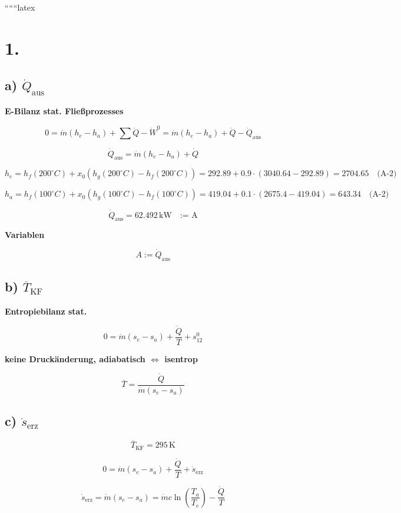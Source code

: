 
``````latex


\section*{1.}

\subsection*{a) $\dot{Q}_{\text{aus}}$}

\textbf{E-Bilanz stat. Fließprozesses}

\[
0 = \dot{m} \left( h_e - h_a \right) + \sum \dot{Q} - \dot{W}^0 = \dot{m} (h_e - h_a) + \dot{Q} - \dot{Q}_{\text{aus}}
\]

\[
\dot{Q}_{\text{aus}} = \dot{m} (h_e - h_a) + \dot{Q}
\]

\[
h_e = h_f(200^\circ C) + x_0 \left( h_g(200^\circ C) - h_f(200^\circ C) \right) = 292.89 + 0.9 \cdot (3040.64 - 292.89) = 2704.65 \quad \text{(A-2)}
\]

\[
h_a = h_f(100^\circ C) + x_0 \left( h_g(100^\circ C) - h_f(100^\circ C) \right) = 419.04 + 0.1 \cdot (2675.4 - 419.04) = 643.34 \quad \text{(A-2)}
\]

\[
\dot{Q}_{\text{aus}} = 62.492 \, \text{kW} \quad \text{:= A}
\]

\textbf{Variablen}

\[
A := \dot{Q}_{\text{aus}}
\]

\subsection*{b) $\overline{T}_{\text{KF}}$}

\textbf{Entropiebilanz stat.}

\[
0 = \dot{m} \left( s_e - s_a \right) + \frac{\dot{Q}}{T} + s^0_{12}
\]

\textbf{keine Druckänderung, adiabatisch $\Leftrightarrow$ isentrop}

\[
\overline{T} = \frac{\dot{Q}}{\dot{m} (s_e - s_a)}
\]

\subsection*{c) $\dot{s}_{\text{erz}}$}

\[
\overline{T}_{\text{KF}} = 295 \, \text{K}
\]

\[
0 = \dot{m} \left( s_e - s_a \right) + \frac{\dot{Q}}{T} + \dot{s}_{\text{erz}}
\]

\[
\dot{s}_{\text{erz}} = \dot{m} \left( s_e - s_a \right) = \dot{m} c \ln \left( \frac{T_a}{T_e} \right) - \frac{\dot{Q}}{T}
\]

